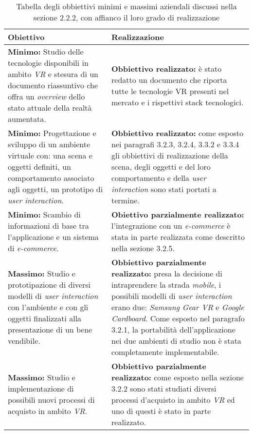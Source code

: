 \begin{table}
	\centering
	\label{tabella-obbiettivi}
	\begin{tabular}{| p{6cm} | p{6cm} |}
		\hline
		\textbf{Obiettivo} & \textbf{Realizzazione} \\ \hline
		 \textbf{Minimo:} Studio delle tecnologie disponibili in ambito \textit{VR}\ped{\hyperlink{vr}{G}} e stesura di un documento riassuntivo che offra un \textit{overview} dello stato attuale della realtà aumentata. &  \textbf{Obbiettivo realizzato:} è stato redatto un documento che riporta tutte le tecnologie VR presenti nel mercato e i rispettivi stack tecnologici.\\ \hline
		 \textbf{Minimo:} Progettazione e sviluppo di un ambiente virtuale con: una scena e oggetti definiti, un comportamento associato agli oggetti, un prototipo di \textit{user interaction}. & \textbf{Obbiettivo realizzato:} come esposto nei paragrafi 3.2.3, 3.2.4, 3.3.2 e 3.3.4 gli obbiettivi di realizzazione della scena, degli oggetti e del loro comportamento e della \textit{user interaction} sono stati portati a termine. \\ \hline
		 \textbf{Minimo:} Scambio di informazioni di base tra l'applicazione e un sistema di \textit{e-commerce}. & \textbf{Obiettivo parzialmente realizzato:} l'integrazione con un \textit{e-commerce} è stata in parte realizzata come descritto nella sezione 3.2.5.\\ \hline
		 \textbf{Massimo:} Studio e prototipazione di diversi modelli di \textit{user interaction} con l'ambiente e con gli oggetti finalizzati alla presentazione di un bene vendibile. & \textbf{Obbiettivo parzialmente realizzato:} presa la decisione di intraprendere la strada \textit{mobile}, i possibili modelli di \textit{user interaction} erano due: \textit{Samsung Gear VR} e \textit{Google Cardboard}. Come esposto nel paragrafo 3.2.1, la portabilità dell'applicazione nei due ambienti di studio non è stata completamente implementabile.\\ \hline
		 \textbf{Massimo:} Studio e implementazione di possibili nuovi processi di acquisto in ambito \textit{VR}\ped{\hyperlink{vr}{G}}. & \textbf{Obbiettivo parzialmente realizzato:} come esposto nella sezione 3.2.2 sono stati studiati diversi processi d'acquisto in ambito \textit{VR}\ped{\hyperlink{vr}{G}} ed uno di questi è stato in parte realizzato.\\ \hline
	\end{tabular}
	\caption{Tabella degli obbiettivi minimi e massimi aziendali discussi nella sezione 2.2.2, con affianco il loro grado di realizzazione}
\end{table}
\FloatBarrier

